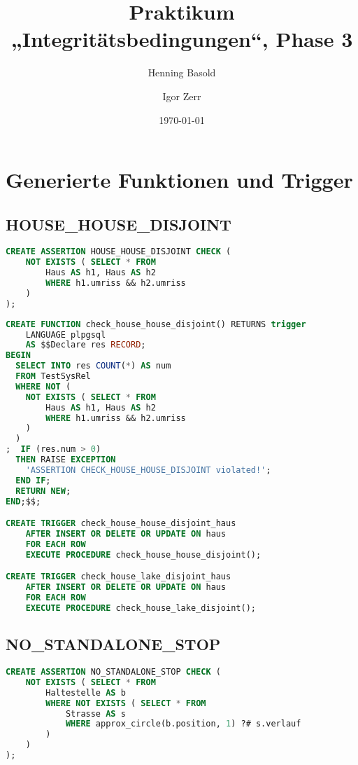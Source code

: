 \documentclass[a4paper]{article}
\title{Praktikum „Integritätsbedingungen“, Phase 3}
\author{Henning Basold \and Igor Zerr}
\date{\today}
\begin{document}
\maketitle

\section{Generierte Funktionen und Trigger}

\subsection{HOUSE\_HOUSE\_DISJOINT}
\begin{lstlisting}[language=sql]
CREATE ASSERTION HOUSE_HOUSE_DISJOINT CHECK (
    NOT EXISTS ( SELECT * FROM
        Haus AS h1, Haus AS h2
        WHERE h1.umriss && h2.umriss
    )
);
\end{lstlisting}

\begin{lstlisting}[language=sql]
CREATE FUNCTION check_house_house_disjoint() RETURNS trigger
    LANGUAGE plpgsql
    AS $$Declare res RECORD;
BEGIN
  SELECT INTO res COUNT(*) AS num
  FROM TestSysRel
  WHERE NOT (
    NOT EXISTS ( SELECT * FROM
        Haus AS h1, Haus AS h2
        WHERE h1.umriss && h2.umriss
    )
  )
;  IF (res.num > 0)
  THEN RAISE EXCEPTION
    'ASSERTION CHECK_HOUSE_HOUSE_DISJOINT violated!';
  END IF;
  RETURN NEW;
END;$$;

CREATE TRIGGER check_house_house_disjoint_haus
    AFTER INSERT OR DELETE OR UPDATE ON haus
    FOR EACH ROW
    EXECUTE PROCEDURE check_house_house_disjoint();

CREATE TRIGGER check_house_lake_disjoint_haus
    AFTER INSERT OR DELETE OR UPDATE ON haus
    FOR EACH ROW
    EXECUTE PROCEDURE check_house_lake_disjoint();

\end{lstlisting}

\subsection{NO\_STANDALONE\_STOP}
\begin{lstlisting}[language=sql]
CREATE ASSERTION NO_STANDALONE_STOP CHECK (
    NOT EXISTS ( SELECT * FROM
        Haltestelle AS b
        WHERE NOT EXISTS ( SELECT * FROM
            Strasse AS s
            WHERE approx_circle(b.position, 1) ?# s.verlauf
        )
    )
);
\end{lstlisting}
\end{document}
